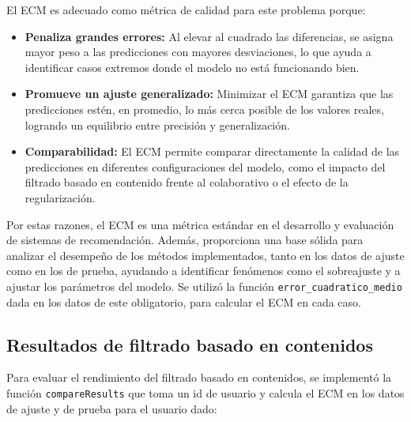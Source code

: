 \documentclass[12pt,a4paper]{article}
\begin{document}
El ECM es adecuado como métrica de calidad para este problema porque:
\begin{itemize}
  \item \textbf{Penaliza grandes errores:} Al elevar al cuadrado las diferencias, se asigna mayor peso a las predicciones con mayores desviaciones, lo que ayuda a identificar casos extremos donde el modelo no está funcionando bien.
  \item \textbf{Promueve un ajuste generalizado:} Minimizar el ECM garantiza que las predicciones estén, en promedio, lo más cerca posible de los valores reales, logrando un equilibrio entre precisión y generalización.
  \item \textbf{Comparabilidad:} El ECM permite comparar directamente la calidad de las predicciones en diferentes configuraciones del modelo, como el impacto del filtrado basado en contenido frente al colaborativo o el efecto de la regularización.
\end{itemize}

Por estas razones, el ECM es una métrica estándar en el desarrollo y evaluación de sistemas de recomendación. Además, proporciona una base sólida para analizar el desempeño de los métodos implementados, tanto en los datos de ajuste como en los de prueba, ayudando a identificar fenómenos como el sobreajuste y a ajustar los parámetros del modelo.
Se utilizó la función \texttt{error\_cuadratico\_medio} dada en los datos de este obligatorio, para calcular el ECM en cada caso.

\subsection*{Resultados de filtrado basado en contenidos}

Para evaluar el rendimiento del filtrado basado en contenidos, se implementó la función \texttt{compareResults} que toma un id de usuario y calcula el ECM en los datos de ajuste y de prueba para el usuario dado:
\end{document}
